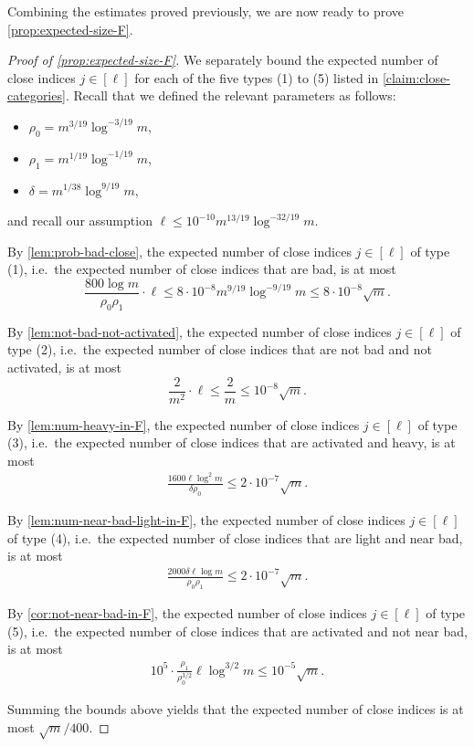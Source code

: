 \documentclass[reqno]{amsart}
\theoremstyle{remark}
\theoremstyle{definition}
\numberwithin{theorem}{section}
\renewcommand{\(}{\bigl(}
\renewcommand{\)}{\bigr)\vphantom{)}}
\renewcommand{\le}{\leqslant}
\begin{document}
Combining the estimates proved previously, we are now ready to prove \cref{prop:expected-size-F}.

\begin{proof}[Proof of \cref{prop:expected-size-F}]
We separately bound the expected number of close indices $j\in [\ell]$ for each of the five types (1) to (5) listed in \cref{claim:close-categories}. Recall that we defined the relevant parameters as follows:

    \begin{itemize}
        \item $\rho_0 = m^{3/19}\log^{-3/19}m$,
        \item $\rho_1 = m^{1/19}\log^{-1/19}m$,
        \item $\delta = m^{1/38}\log^{9/19}m$,
    \end{itemize}
    and recall our assumption $\ell\le 10^{-10}m^{13/19}\log^{-32/19}m$.

    By \cref{lem:prob-bad-close}, the expected number of close indices $j\in [\ell]$ of type (1), i.e.\ the expected number of close indices that are bad, is at most 
    \[\frac{800\log m}{\rho_0\rho_1} \cdot \ell\le 8\cdot 10^{-8}m^{9/19}\log^{-9/19}m\le 8\cdot 10^{-8}\sqrt{m}.\]
    
    By \cref{lem:not-bad-not-activated}, the expected number of close indices $j\in [\ell]$ of type (2), i.e.\ the expected number of close indices that are not bad and not activated, is at most
    \[\frac{2}{m^2}\cdot \ell\le \frac{2}{m}\le 10^{-8}\sqrt{m}.\]
    
    
    By \cref{lem:num-heavy-in-F}, the expected number of close indices $j\in [\ell]$ of type (3), i.e.\ the expected number of close indices that are activated and heavy, is at most
    \begin{align*}
        \frac{1600\ell\log^2 m}{\delta\rho_0}\le 2\cdot 10^{-7}\sqrt{m}. 
    \end{align*}
    
    By \cref{lem:num-near-bad-light-in-F}, the expected number of close indices $j\in [\ell]$ of type (4), i.e.\ the expected number of close indices that are light and near bad, is at most
    \begin{align*}
        \frac{2000\delta \ell\log m}{\rho_0\rho_1}\le 2\cdot 10^{-7}\sqrt{m}.
    \end{align*}
    
    By \cref{cor:not-near-bad-in-F}, the expected number of close indices $j\in [\ell]$ of type (5), i.e.\ the expected number of close indices that are activated and not near bad, is at most 
    \begin{align*}
         10^5\cdot \frac{\rho_1}{\rho_0^{3/2}}\ell\log^{3/2} m \le 10^{-5}\sqrt{m}.
    \end{align*}
    
    Summing the bounds above yields that the expected number of close indices is at most $\sqrt{m}/400$.
\end{proof}
\end{document}
